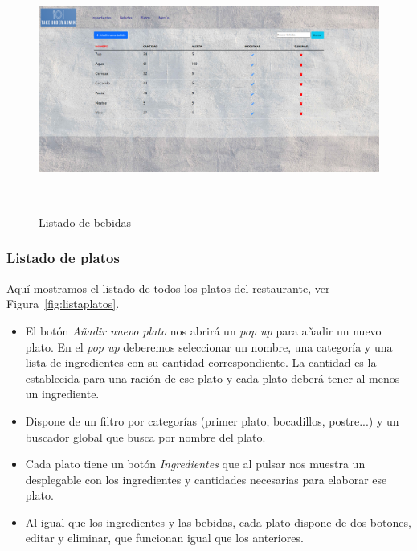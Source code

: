 \begin{figure}[h]
    \centering
    \includegraphics[width=15cm, height=8cm]{Imagenes/Figuras/listabebidas.png} 
   \caption{Listado de bebidas\label{fig:listabebidas}}
\end{figure}

\subsubsection*{Listado de platos}

Aquí mostramos el listado de todos los platos del restaurante, ver Figura~\ref{fig:listaplatos}. 
\begin{itemize} 

\item El botón \textit{Añadir nuevo plato} nos abrirá un \textit{pop up} para añadir un nuevo plato. En el \textit{pop up} deberemos seleccionar un nombre, una categoría y una lista de ingredientes con su cantidad correspondiente. La cantidad es la establecida para una ración de ese plato y cada plato deberá tener al menos un ingrediente. 

\item Dispone de un filtro por categorías (primer plato, bocadillos, postre...) y un buscador global que busca por nombre del plato.

\item Cada plato tiene un botón \textit{Ingredientes} que al pulsar nos muestra un desplegable con los ingredientes y cantidades necesarias para elaborar ese plato.

\item Al igual que los ingredientes y las bebidas, cada plato dispone de dos botones, editar y eliminar, que funcionan igual que los anteriores.

\end{itemize}

